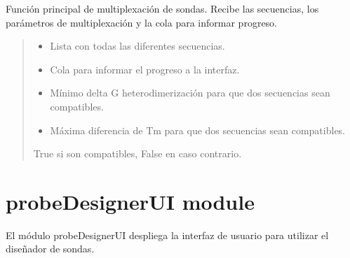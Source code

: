 \documentclass[letterpaper,10pt,spanish]{sphinxmanual}
\begin{document}
\begin{fulllineitems}
\label{\detokenize{multiplex:multiplex.multiplex_sequences}}
\pysigstartsignatures
{}
\pysigstopsignatures
\sphinxAtStartPar
Función principal de multiplexación de sondas. Recibe las secuencias, los parámetros de multiplexación y la cola para informar progreso.
\begin{quote}\begin{description}
\begin{itemize}
\item {} 
\sphinxAtStartPar
{} \textendash{} Lista con todas las diferentes secuencias.

\item {} 
\sphinxAtStartPar
{} \textendash{} Cola para informar el progreso a la interfaz.

\item {} 
\sphinxAtStartPar
{} \textendash{} Mínimo delta G heterodimerización para que dos secuencias sean compatibles.

\item {} 
\sphinxAtStartPar
{} \textendash{} Máxima diferencia de Tm para que dos secuencias sean compatibles.

\end{itemize}

\sphinxAtStartPar
True si son compatibles, False en caso contrario.

\end{description}\end{quote}

\end{fulllineitems}


\sphinxstepscope


\section{probeDesignerUI module}
\label{\detokenize{probeDesignerUI:probedesignerui-module}}\label{\detokenize{probeDesignerUI::doc}}
\sphinxAtStartPar
El módulo probeDesignerUI despliega la interfaz de usuario para utilizar el diseñador de sondas.
\label{\detokenize{probeDesignerUI:module-probeDesignerUI}}
\end{document}
